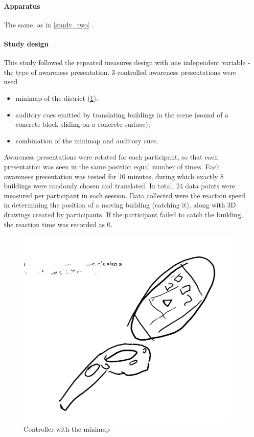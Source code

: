 \paragraph{Apparatus} The same, as in \ref{study_two} .

\paragraph{Study design}
This study followed the repeated measures design with one independent variable - the type of awareness presentation. 3 controlled awareness presentations were used
\begin{itemize}
	\item minimap of the district (\ref{fig:minimap_controller});
	\item auditory cues emitted by translating buildings in the scene (sound of a concrete block sliding on a concrete surface);
	\item combination of the minimap and auditory cues.
\end{itemize}

Awareness presentations were rotated for each participant, so that each presentation was seen in the same position equal number of times. 
Each awareness presentation was tested for 10 minutes, during which exactly 8 buildings were randomly chosen and translated. In total, 24 data points were measured per participant in each session. Data collected were the reaction speed in determining the position of a moving building (catching it), along with 3D drawings created by participants. If the participant failed to catch the building, the reaction time was recorded as 0.

\begin{figure}[h]
	\centering
	\includegraphics[width=0.7\linewidth]{figures/placeholders/minimap_controller}
	\caption{Controller with the minimap}
	\label{fig:minimap_controller}
\end{figure}

